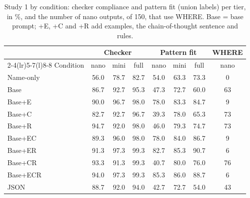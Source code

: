 \begin{table}
  \caption{Study 1 by condition: checker compliance and pattern fit (union labels) per tier, in \%, and the number of nano outputs, of 150, that use WHERE. Base = base prompt; +E, +C and +R add examples, the chain-of-thought sentence and rules.}
  \label{tab:study1}
  \footnotesize
  \setlength{\tabcolsep}{3pt}
  \begin{tabular}{@{}lccccccc@{}}
    \toprule
    & \multicolumn{3}{c}{Checker} & \multicolumn{3}{c}{Pattern fit} & WHERE \\
    \cmidrule(lr){2-4}\cmidrule(lr){5-7}\cmidrule(l){8-8}
    Condition & nano & mini & full & nano & mini & full & nano \\
    \midrule
    Name-only & 56.0 & 78.7 & 82.7 & 54.0 & 63.3 & 73.3 & 0 \\
    Base & 86.7 & 92.7 & 95.3 & 47.3 & 72.7 & 60.0 & 63 \\
    \midrule
    Base+E & 90.0 & 96.7 & 98.0 & 78.0 & 83.3 & 84.7 & 9 \\
    Base+C & 82.7 & 92.7 & 96.7 & 39.3 & 78.0 & 65.3 & 73 \\
    Base+R & 94.7 & 92.0 & 98.0 & 46.0 & 79.3 & 74.7 & 73 \\
    Base+EC & 89.3 & 96.0 & 98.0 & 78.0 & 84.0 & 86.7 & 9 \\
    Base+ER & 91.3 & 97.3 & 99.3 & 82.7 & 85.3 & 90.7 & 6 \\
    Base+CR & 93.3 & 91.3 & 99.3 & 40.7 & 80.0 & 76.0 & 76 \\
    Base+ECR & 94.0 & 97.3 & 99.3 & 85.3 & 86.0 & 88.7 & 6 \\
    \midrule
    JSON & 88.7 & 92.0 & 94.0 & 42.7 & 72.7 & 54.0 & 43 \\
    \bottomrule
  \end{tabular}
\end{table}
